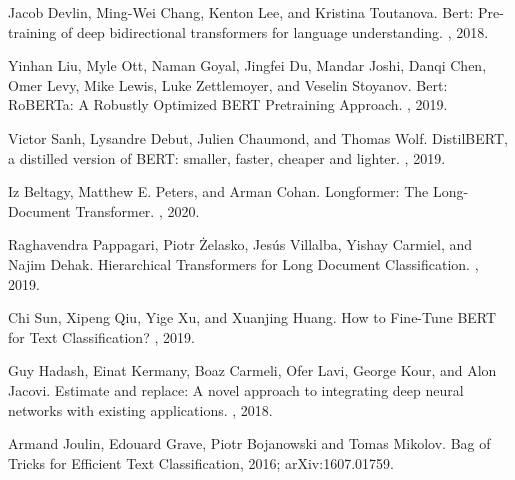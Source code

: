 \documentclass[twocolumn,10pt]{wmrDoc}
\begin{document}



  


\begin{thebibliography}{1}

Jacob Devlin, Ming-Wei Chang, Kenton Lee, and Kristina Toutanova.
\newblock Bert: Pre-training of deep bidirectional transformers for language understanding.
, 2018.

Yinhan Liu, Myle Ott, Naman Goyal, Jingfei Du, Mandar Joshi, Danqi Chen, Omer Levy, Mike Lewis, Luke Zettlemoyer, and Veselin Stoyanov.
\newblock Bert: RoBERTa: A Robustly Optimized BERT Pretraining Approach.
, 2019.

Victor Sanh, Lysandre Debut, Julien Chaumond, and Thomas Wolf.
\newblock DistilBERT, a distilled version of BERT: smaller, faster, cheaper and lighter.
, 2019.

Iz Beltagy, Matthew E. Peters, and Arman Cohan.
\newblock Longformer: The Long-Document Transformer.
, 2020.

Raghavendra Pappagari, Piotr Żelasko, Jesús Villalba, Yishay Carmiel, and Najim Dehak.
\newblock Hierarchical Transformers for Long Document Classification.
, 2019.

Chi Sun, Xipeng Qiu, Yige Xu, and Xuanjing Huang.
\newblock How to Fine-Tune BERT for Text Classification?
, 2019.

Guy Hadash, Einat Kermany, Boaz Carmeli, Ofer Lavi, George Kour, and Alon
  Jacovi.
\newblock Estimate and replace: A novel approach to integrating deep neural
  networks with existing applications.
, 2018.

Armand Joulin, Edouard Grave, Piotr Bojanowski and Tomas Mikolov.
\newblock Bag of Tricks for Efficient Text Classification, 2016;
\newblock arXiv:1607.01759.


\end{thebibliography}
\end{document}
